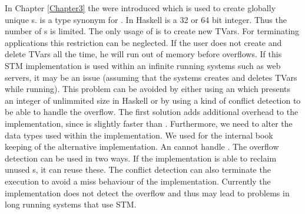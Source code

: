 In Chapter \ref{Chapter3} the  were introduced which is used to create globally unique 
s.  is a type synonym for . In Haskell  is a 32 or 64 bit integer. Thus 
the number of s is limited. The only usage of  is to create new TVars. For terminating 
applications this restriction can be neglected. If the user does not create and delete TVars all the time,
he will run out of memory before  overflows. If this STM implementation is used within an
infinite running systems such as web servers, it may be an issue (assuming that the systems creates and
deletes TVars while running). This problem can be avoided by either using an  which presents
an integer of unlimmited size in Haskell or by using a kind of conflict detection to be able to handle the 
overflow. The first solution adds additional overhead to the implementation, since  is slightly 
faster than . Furthermore, we need to alter the data types used within the implementation. 
We used  for the internal book keeping of the alternative implementation. An  cannot 
handle . The overflow detection can be used in two ways. If the implementation is able 
to reclaim unused s, it can reuse these. The conflict detection can also terminate the execution to 
avoid a miss behaviour of the implementation. Currently the implementation does not detect the overflow 
and thus may lead to problems in long running systems that use STM.

